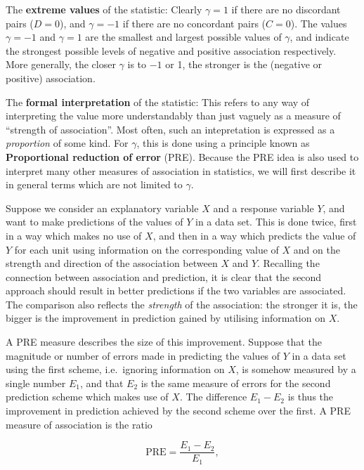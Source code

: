 \documentclass[11pt,a4paper,openany]{book}
\begin{document}
The \textbf{extreme values} of the statistic: Clearly \(\gamma=1\) if
there are no discordant pairs (\(D=0\)), and \(\gamma=-1\) if there are
no concordant pairs (\(C=0\)). The values \(\gamma=-1\) and \(\gamma=1\)
are the smallest and largest possible values of \(\gamma\), and indicate
the strongest possible levels of negative and positive association
respectively. More generally, the closer \(\gamma\) is to \(-1\) or 1,
the stronger is the (negative or positive) association.

The \textbf{formal interpretation} of the statistic: This refers to any
way of interpreting the value more understandably than just vaguely as a
measure of ``strength of association''. Most often, such an
intepretation is expressed as a \emph{proportion} of some kind. For
\(\gamma\), this is done using a principle known as \textbf{Proportional
reduction of error} (PRE). Because the PRE idea is also used to
interpret many other measures of association in statistics, we will
first describe it in general terms which are not limited to \(\gamma\).

Suppose we consider an explanatory variable \(X\) and a response
variable \(Y\), and want to make predictions of the values of \(Y\) in a
data set. This is done twice, first in a way which makes no use of
\(X\), and then in a way which predicts the value of \(Y\) for each unit
using information on the corresponding value of \(X\) and on the
strength and direction of the association between \(X\) and \(Y\).
Recalling the connection between association and prediction, it is clear
that the second approach should result in better predictions if the two
variables are associated. The comparison also reflects the
\emph{strength} of the association: the stronger it is, the bigger is
the improvement in prediction gained by utilising information on \(X\).

A PRE measure describes the size of this improvement. Suppose that the
magnitude or number of errors made in predicting the values of \(Y\) in
a data set using the first scheme, i.e.~ignoring information on \(X\),
is somehow measured by a single number \(E_{1}\), and that \(E_{2}\) is
the same measure of errors for the second prediction scheme which makes
use of \(X\). The difference \(E_{1}-E_{2}\) is thus the improvement in
prediction achieved by the second scheme over the first. A PRE measure
of association is the ratio

\begin{equation}\text{PRE}= \frac{E_{1}-E_{2}}{E_{1}},
\label{eq:PRE}\end{equation}
\end{document}
